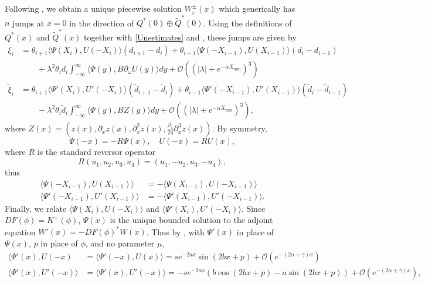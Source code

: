 \documentclass[12pt]{elsarticle}
\begin{document}
Following \cite{Manukian,Sandstede1998}, we obtain a unique piecewise solution $W_i^\pm(x)$ which generically has $n$ jumps at $x = 0$ in the direction of $Q^*(0) \oplus \tilde{Q}^*(0)$. Using the definitions of $Q^*(x)$ and $\tilde{Q}^*(x)$ together with \cref{Unestimates} and \cite[(3.19)]{Manukian}, these jumps are given by
\begin{equation}\label{jumpcond1}
\begin{aligned}
\xi_i &= \theta_{i+1} \langle \Psi(X_i), U(-X_i) \rangle (d_{i+1} - d_i) 
+ \theta_{i-1} \langle \Psi(-X_{i-1}), U(X_{i-1}) \rangle (d_i - d_{i-1} )  \\
&\qquad + \lambda^2 \theta_i d_i \int_{-\infty}^\infty \langle \Psi(y), B \partial_\omega U(y) \rangle dy 
+ \mathcal{O}((|\lambda| + e^{-\alpha X_{\min}})^3) \\
\tilde{\xi}_i &= \theta_{i+1} \langle \Psi'(X_i), U'(-X_i) \rangle (\tilde{d}_{i+1} - \tilde{d}_i) 
+ \theta_{i-1} \langle \Psi'(-X_{i-1}), U'(X_{i-1}) \rangle (\tilde{d}_i - \tilde{d}_{i-1}) \\
&\qquad- \lambda^2 \theta_i \tilde{d}_i \int_{-\infty}^\infty \langle \Psi(y), B Z(y) \rangle dy 
+ \mathcal{O}((|\lambda| + e^{-\alpha X_{\min}})^3),
\end{aligned}
\end{equation}
where $Z(x) = (z(x), \partial_x z(x), \partial_x^2 z(x), \frac{\beta_4}{24} \partial_x^3 z(x))$. By symmetry, 
\begin{equation}\label{Rrelation}
\Psi(-x) = -R \Psi(x), \quad U(-x) = R U(x),
\end{equation}
where $R$ is the standard reversor operator 
\[
R(u_1, u_2, u_3, u_4) = (u_1, -u_2, u_3, -u_4),
\] 
thus 
\begin{equation}\label{PsiR}
\begin{aligned}
\langle \Psi(-X_{i-1}), U(X_{i-1}) \rangle &= -\langle \Psi(X_{i-1}), U(-X_{i-1}) \rangle \\
\langle \Psi'(-X_{i-1}), U'(X_{i-1}) \rangle &= -\langle \Psi'(X_{i-1}), U'(-X_{i-1}) \rangle.
\end{aligned} 
\end{equation}
Finally, we relate $\langle \Psi(X_i), U(-X_i) \rangle$ and $\langle \Psi'(X_i), U'(-X_i) \rangle$. Since $DF(\phi) = K^+(\phi)$, $\Psi(x)$ is the unique bounded solution to the adjoint equation $W'(x) = -DF(\phi)^* W(x)$. Thus by \cite[Lemma 6.1]{Sandstede1998}, with $\Psi'(x)$ in place of $\Psi(x)$, $p$ in place of $\phi$, and no parameter $\mu$,
\begin{align}
\langle \Psi'(x), U(-x) &= \langle \Psi'(-x), U(x) \rangle = s e^{-2 a x} \sin(2 b x + p) + \mathcal{O}(e^{-(2 \alpha + \gamma)x}) \label{IPdPsiU} \\
\langle \Psi'(x), U'(-x) \rangle &= 
\langle \Psi'(x), U'(-x) \rangle = -s e^{-2 a x} \left( b \cos(2 b x + p) - a \sin(2 b x + p) \right) + \mathcal{O}(e^{-(2 \alpha + \gamma)x}), \label{IPdPsidU}
\end{align}
\end{document}

